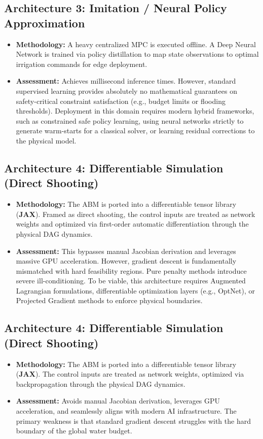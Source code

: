 \documentclass[11pt, a4paper]{article}
\begin{document}
\subsection{Architecture 3: Imitation / Neural Policy Approximation}
\begin{itemize}
    \item \textbf{Methodology:} A heavy centralized MPC is executed offline. A Deep Neural Network is trained via policy distillation to map state observations to optimal irrigation commands for edge deployment.
    \item \textbf{Assessment:} Achieves millisecond inference times. However, standard supervised learning provides absolutely no mathematical guarantees on safety-critical constraint satisfaction (e.g., budget limits or flooding thresholds). Deployment in this domain requires modern hybrid frameworks, such as constrained safe policy learning, using neural networks strictly to generate warm-starts for a classical solver, or learning residual corrections to the physical model.
\end{itemize}

\subsection{Architecture 4: Differentiable Simulation (Direct Shooting)}
\begin{itemize}
    \item \textbf{Methodology:} The ABM is ported into a differentiable tensor library (\textbf{JAX}). Framed as direct shooting, the control inputs are treated as network weights and optimized via first-order automatic differentiation through the physical DAG dynamics.
    \item \textbf{Assessment:} This bypasses manual Jacobian derivation and leverages massive GPU acceleration. However, gradient descent is fundamentally mismatched with hard feasibility regions. Pure penalty methods introduce severe ill-conditioning. To be viable, this architecture requires Augmented Lagrangian formulations, differentiable optimization layers (e.g., OptNet), or Projected Gradient methods to enforce physical boundaries.
\end{itemize}

\subsection{Architecture 4: Differentiable Simulation (Direct Shooting)}
\begin{itemize}
    \item \textbf{Methodology:} The ABM is ported into a differentiable tensor library (\textbf{JAX}). The control inputs are treated as network weights, optimized via backpropagation through the physical DAG dynamics.
    \item \textbf{Assessment:} Avoids manual Jacobian derivation, leverages GPU acceleration, and seamlessly aligns with modern AI infrastructure. The primary weakness is that standard gradient descent struggles with the hard boundary of the global water budget.
\end{itemize}
\end{document}
